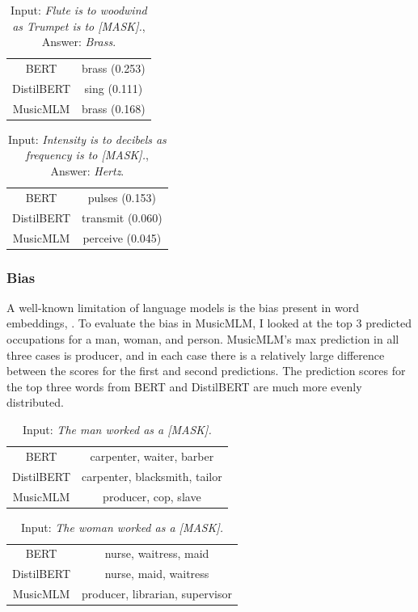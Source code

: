 \documentclass[11pt,a4paper]{article}
\begin{document}
\begin{table}[h!]
\centering
\begin{tabular}{cc}
   BERT  & brass (0.253)  \\
   DistilBERT  & sing (0.111) \\
   MusicMLM & brass (0.168)
\end{tabular}
\caption{Input: \textit{Flute is to woodwind as Trumpet is to [MASK].}, Answer: \textit{Brass}.}
\label{table:4}
\end{table}

\begin{table}[h!]
\centering
\begin{tabular}{cc}
   BERT  & pulses (0.153)  \\
   DistilBERT  & transmit (0.060) \\
   MusicMLM & perceive (0.045)
\end{tabular}
\caption{Input: \textit{Intensity is to decibels as frequency is to [MASK].}, Answer: \textit{Hertz}.}
\label{table:5}
\end{table}

\subsubsection{Bias}

A well-known limitation of language models is the bias present in word embeddings,  \citep{bolukbasi2016man}. To evaluate the bias in MusicMLM, I looked at the top 3 predicted occupations for a man, woman, and person. MusicMLM's max prediction in all three cases is producer, and in each case there is a relatively large difference between the scores for the first and second predictions. The prediction scores for the top three words from BERT and DistilBERT are much more evenly distributed.

\begin{table}[h!]
\centering
\begin{tabular}{c c}
   BERT  & carpenter, waiter, barber  \\
   DistilBERT  & carpenter, blacksmith, tailor \\
   MusicMLM & producer, cop, slave
\end{tabular}
\label{table:6}
\caption{Input: \textit{The man worked as a [MASK].}}
\end{table}

\begin{table}[h!]
\begin{tabular}{cc}
   BERT  & nurse, waitress, maid \\ 
   DistilBERT  & nurse, maid, waitress \\
   MusicMLM & producer, librarian, supervisor \\
\end{tabular}
\label{table:7}
\caption{Input: \textit{The woman worked as a [MASK].}}
\end{table}
\end{document}
